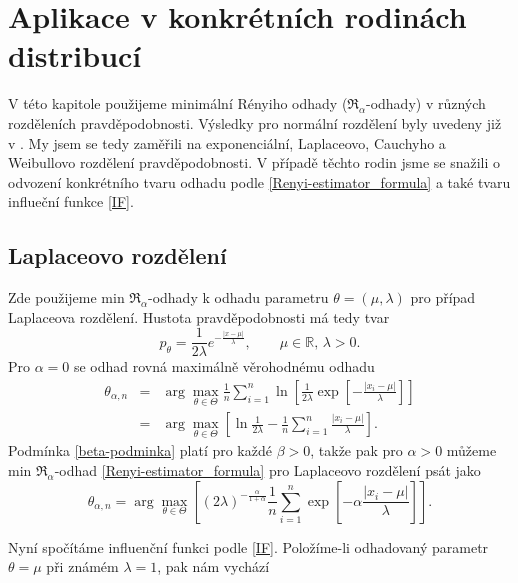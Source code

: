
\chapter{Aplikace v konkrétních rodinách distribucí}

V této kapitole použijeme minimální Rényiho odhady ($\mathfrak{R}_\alpha$-odhady) v různých rozděleních pravděpodobnosti. Výsledky pro normální rozdělení byly uvedeny již v \cite{Demut2010}. My jsem se tedy zaměřili na exponenciální, Laplaceovo, Cauchyho a Weibullovo rozdělení pravděpodobnosti. V případě těchto rodin jsme se snažili o odvození konkrétního tvaru odhadu podle \eqref{Renyi-estimator_formula} a také tvaru influeční funkce \eqref{IF}.

\section{Laplaceovo rozdělení} %

Zde použijeme min $\mathfrak{R}_\alpha$-odhady k odhadu parametru $\theta = (\mu,\lambda)$ pro případ Laplaceova rozdělení. Hustota pravděpodobnosti má tedy tvar
\begin{equation}
	p_\theta = \frac{1}{2\lambda} e^{-\frac{|x-\mu|}{\lambda}}, \qquad \mu\in \mathbb{R},\, \lambda>0.
\end{equation}
Pro $\alpha = 0$ se odhad rovná maximálně věrohodnému odhadu 
\begin{eqnarray}
	\theta_{\alpha,n} & = & \arg \max_{\theta \in \Theta} \frac{1}{n} \sum^n_{i=1} \ln \left[ \frac{1}{2\lambda}\exp \left[-\frac{|x_i-\mu|}{\lambda} \right] \right] \nonumber \\
	& = & \arg \max_{\theta \in \Theta} \left[ \ln \frac{1}{2\lambda} - \frac{1}{n} \sum^n_{i=1} \frac{|x_i-\mu|}{\lambda} \right].
\end{eqnarray}
Podmínka \ref{beta-podminka} platí pro každé $\beta>0$, takže pak pro $\alpha>0$ můžeme  min $\mathfrak{R}_\alpha$-odhad \eqref{Renyi-estimator_formula} pro Laplaceovo rozdělení psát jako 
\begin{equation}
	\theta_{\alpha,n} = \arg \max_{\theta \in \Theta} \left[ (2\lambda)^{-\frac{\alpha}{1+\alpha}} \frac{1}{n} \sum_{i=1}^n \exp \left[-\alpha\frac{|x_i-\mu|}{\lambda} \right] \right].
	\label{renyi-formula-laplace}
\end{equation}

Nyní spočítáme influenční funkci podle \eqref{IF}. Položíme-li odhadovaný parametr $\theta = \mu$ při známém $\lambda = 1$, pak nám vychází 

